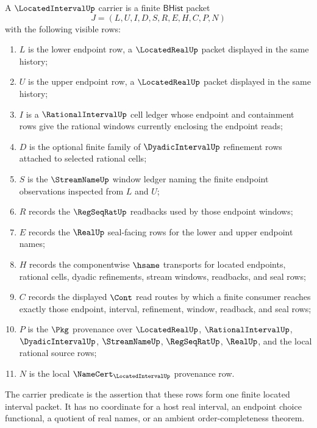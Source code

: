\begin{definition}
\label{def:located-interval-carrier}
A $\LocatedIntervalUp$ carrier is a finite $\mathsf{BHist}$ packet
$$
J=(L,U,I,D,S,R,E,H,C,P,N)
$$
with the following visible rows:
\begin{enumerate}
\item $L$ is the lower endpoint row, a $\LocatedRealUp$ packet displayed in the same history;
\item $U$ is the upper endpoint row, a $\LocatedRealUp$ packet displayed in the same history;
\item $I$ is a $\RationalIntervalUp$ cell ledger whose endpoint and containment rows give the rational windows currently enclosing the endpoint reads;
\item $D$ is the optional finite family of $\DyadicIntervalUp$ refinement rows attached to selected rational cells;
\item $S$ is the $\StreamNameUp$ window ledger naming the finite endpoint observations inspected from $L$ and $U$;
\item $R$ records the $\RegSeqRatUp$ readbacks used by those endpoint windows;
\item $E$ records the $\RealUp$ seal-facing rows for the lower and upper endpoint names;
\item $H$ records the componentwise $\hsame$ transports for located endpoints, rational cells, dyadic refinements, stream windows, readbacks, and seal rows;
\item $C$ records the displayed $\Cont$ read routes by which a finite consumer reaches exactly those endpoint, interval, refinement, window, readback, and seal rows;
\item $P$ is the $\Pkg$ provenance over $\LocatedRealUp$, $\RationalIntervalUp$, $\DyadicIntervalUp$, $\StreamNameUp$, $\RegSeqRatUp$, $\RealUp$, and the local rational source rows;
\item $N$ is the local $\NameCert_{\LocatedIntervalUp}$ provenance row.
\end{enumerate}
The carrier predicate is the assertion that these rows form one finite located interval packet. It has no coordinate for a host real interval, an endpoint choice functional, a quotient of real names, or an ambient order-completeness theorem.
\end{definition}

